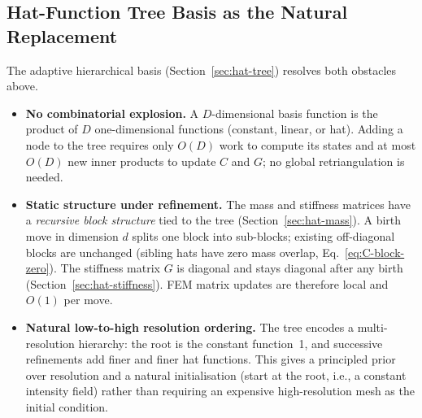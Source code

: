 \documentclass[11pt]{article}
\begin{document}
\subsection{Hat-Function Tree Basis as the Natural Replacement}
\label{sec:lesson-tree-basis}

The adaptive hierarchical basis (Section~\ref{sec:hat-tree}) resolves both
obstacles above.

\begin{itemize}
  \item \textbf{No combinatorial explosion.}
    A $D$-dimensional basis function is the product of $D$ one-dimensional
    functions (constant, linear, or hat).  Adding a node to the tree requires
    only $O(D)$ work to compute its states and at most $O(D)$ new inner
    products to update $C$ and $G$; no global retriangulation is needed.
  \item \textbf{Static structure under refinement.}
    The mass and stiffness matrices have a \emph{recursive block structure}
    tied to the tree (Section~\ref{sec:hat-mass}).  A birth move in dimension
    $d$ splits one block into sub-blocks; existing off-diagonal blocks are
    unchanged (sibling hats have zero mass overlap, Eq.~\eqref{eq:C-block-zero}).
    The stiffness matrix $G$ is diagonal and stays diagonal after any birth
    (Section~\ref{sec:hat-stiffness}).  FEM matrix updates are therefore local
    and $O(1)$ per move.
  \item \textbf{Natural low-to-high resolution ordering.}
    The tree encodes a multi-resolution hierarchy: the root is the constant
    function~1, and successive refinements add finer and finer hat functions.
    This gives a principled prior over resolution and a natural initialisation
    (start at the root, i.e., a constant intensity field) rather than requiring
    an expensive high-resolution mesh as the initial condition.
\end{itemize}
\end{document}
